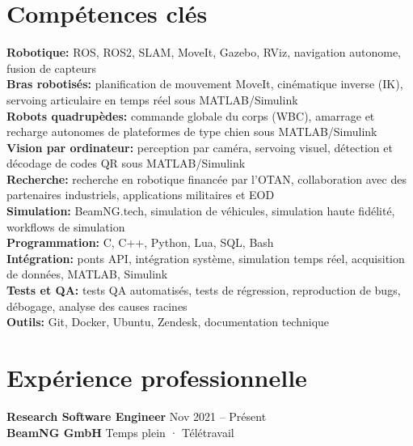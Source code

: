 \documentclass[11pt,a4paper]{article}
\begin{document}
\section*{Compétences clés}

{\small
\textbf{\color{PrimaryColor}Robotique:} ROS, ROS2, SLAM, MoveIt, Gazebo, RViz, navigation autonome, fusion de capteurs\\
\textbf{\color{PrimaryColor}Bras robotisés:} planification de mouvement MoveIt, cinématique inverse (IK), servoing articulaire en temps réel sous MATLAB/Simulink\\
\textbf{\color{PrimaryColor}Robots quadrupèdes:} commande globale du corps (WBC), amarrage et recharge autonomes de plateformes de type chien sous MATLAB/Simulink\\
\textbf{\color{PrimaryColor}Vision par ordinateur:} perception par caméra, servoing visuel, détection et décodage de codes QR sous MATLAB/Simulink\\
\textbf{\color{PrimaryColor}Recherche:} recherche en robotique financée par l'OTAN, collaboration avec des partenaires industriels, applications militaires et EOD\\
\textbf{\color{PrimaryColor}Simulation:} BeamNG.tech, simulation de véhicules, simulation haute fidélité, workflows de simulation\\
\textbf{\color{PrimaryColor}Programmation:} C, C++, Python, Lua, SQL, Bash\\
\textbf{\color{PrimaryColor}Intégration:} ponts API, intégration système, simulation temps réel, acquisition de données, MATLAB, Simulink\\
\textbf{\color{PrimaryColor}Tests et QA:} tests QA automatisés, tests de régression, reproduction de bugs, débogage, analyse des causes racines\\
\textbf{\color{PrimaryColor}Outils:} Git, Docker, Ubuntu, Zendesk, documentation technique
}

\section*{Expérience professionnelle}

\textbf{\color{PrimaryColor}Research Software Engineer} \hfill Nov 2021 -- Présent\\
\textbf{BeamNG GmbH} \hfill Temps plein · Télétravail
\end{document}
